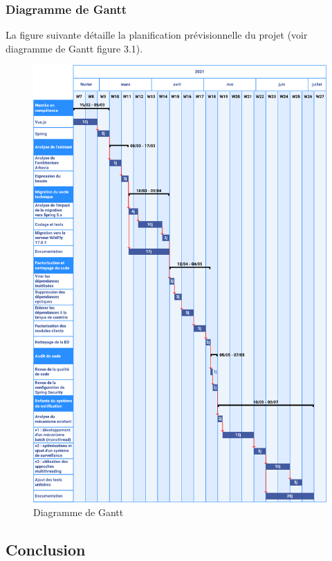 \subsubsection{Diagramme de Gantt}
La figure suivante détaille la planification prévisionnelle du
projet (voir diagramme de Gantt figure 3.1).\\
\begin{figure}[H]
    \begin{center}
        \includegraphics[width=\linewidth]{images/sec3/gantt.pdf}
        \caption{Diagramme de Gantt}
    \end{center}
\end{figure}
\subsection{Conclusion}
